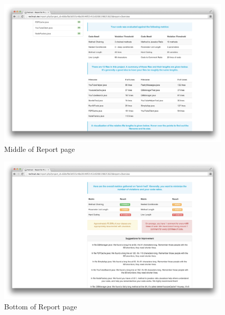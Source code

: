 \documentclass{sig-alternate}
\begin{document}
\begin{figure}[ht]
	\begin{center}
		\includegraphics[width=500px]{report_overview2}
	\end{center}
	\vspace{-12pt}
	\caption{Middle of Report page}
	\label{fig:report2}
\end{figure}

\begin{figure}[ht]
	\begin{center}
		\includegraphics[width=500px]{report_overview3}
	\end{center}
	\vspace{-12pt}
	\caption{Bottom of Report page}
	\label{fig:report2}
\end{figure}
\end{document}
